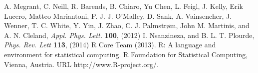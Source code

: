\documentclass{report}
\begin{document}
\begin{thebibliography}{99}
 A.  Megrant, C.  Neill, R.  Barends, B.  Chiaro,  Yu Chen, L.  Feigl, J.  Kelly,  Erik Lucero,  Matteo Mariantoni, P. J. J.  O’Malley, D.  Sank, A.  Vainsencher, J.  Wenner, T. C.  White, Y.  Yin, J.  Zhao, C. J.  Palmstrøm,  John M. Martinis, and A. N.  Cleland, \textit{Appl. Phys. Lett.} \textbf{100},  (2012)
 I.  Nsanzineza, and B. L. T.  Plourde, \textit{Phys. Rev. Lett} \textbf{113},  (2014)
  R Core Team (2013). R: A language and environment for statistical computing. R Foundation for Statistical Computing, Vienna, Austria.  URL http://www.R-project.org/.

\end{thebibliography}
\end{document}
